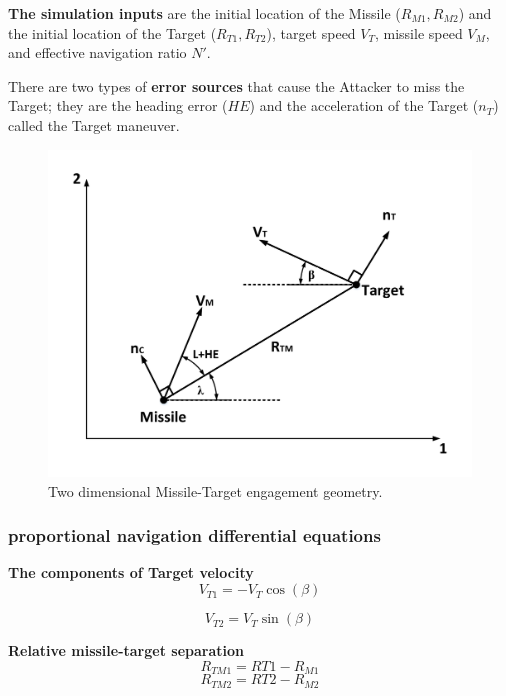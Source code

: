 \textbf{The simulation inputs} are the initial location of the Missile ($R_{M1}, R_{M2}$) and the initial location of the Target ($R_{T1}, R_{T2}$), target speed $V_T$, missile speed $V_M$, and effective navigation ratio $N'$.

There are two types of \textbf{error sources} that cause the Attacker to miss the Target; they are the heading error ($HE$) and the acceleration of the Target ($n_T$) called the Target maneuver.

\begin{figure}[htb]
	\centering
	\includegraphics[scale = 0.65]{fig/PN.pdf}
	\caption{Two dimensional Missile-Target engagement geometry.}
	\label{PN}
\end{figure}


\subsubsection*{proportional navigation differential equations}

\textbf{The components of Target velocity} 
\begin{equation}
	V_{T1} = - V_T \cos(\beta)
\end{equation}

\begin{equation}
V_{T2} =  V_T \sin(\beta)
\end{equation}

\textbf{Relative missile-target separation}
\begin{equation}
	R_{TM1} = R{T1} - R_{M1}
\end{equation}
\begin{equation}
R_{TM2} = R{T2} - R_{M2}
\end{equation}

